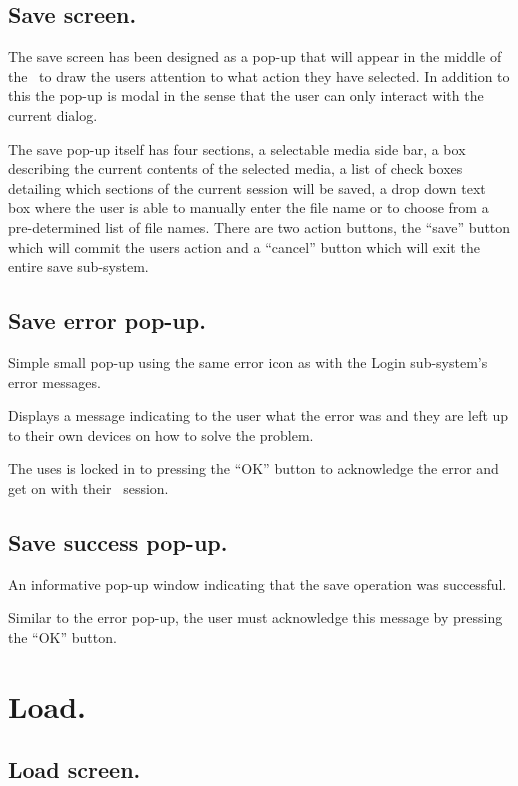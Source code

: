 \subsection{Save screen.}

The save screen has been designed as a pop-up that will appear in the middle of the \iDesk\ to draw the users attention to what action they have selected. In addition to this the pop-up is modal in the sense that the user can only interact with the current dialog.

The save pop-up itself has four sections, a selectable media side bar, a box describing the current contents of the selected media, a list of check boxes detailing which sections of the current session will be saved, a drop down text box where the user is able to manually enter the file name or to choose from a pre-determined list of file names. There are two action buttons, the ``save'' button which will commit the users action and a ``cancel'' button which will exit the entire save sub-system.

\subsection{Save error pop-up.}

Simple small pop-up using the same error icon as with the Login sub-system's error messages.

Displays a message indicating to the user what the error was and they are left up to their own devices on how to solve the problem.

The uses is locked in to pressing the ``OK'' button to acknowledge the error and get on with their \iDesk\ session.

\subsection{Save success pop-up.}

An informative pop-up window indicating that the save operation was successful.

Similar to the error pop-up, the user must acknowledge this message by pressing the ``OK'' button.

\section{Load.}

\subsection{Load screen.}

